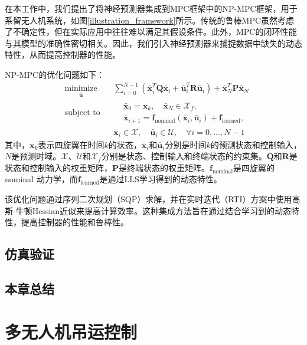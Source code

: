 \documentclass[lang=chs, degree=master, blindreview=false, winfonts=true]{yanputhesis}
\begin{document}
在本工作中，我们提出了将神经预测器集成到MPC框架中的NP-MPC框架，用于系留无人机系统，如图\ref{illustration_framework}所示。传统的鲁棒MPC虽然考虑了不确定性，但在实际应用中往往难以满足其假设条件。此外，MPC的闭环性能与其模型的准确性密切相关。因此，我们引入神经预测器来捕捉数据中缺失的动态特性，从而提高控制器的性能。

NP-MPC的优化问题如下：
\begin{equation}
	\begin{aligned} \label{nmpc}
		&\operatorname*{minimize}_{\bm{\bar{u}}}& & \sum_{i=0}^{N-1}\left(\bm{\bar{x}}_i^T\bm{Q}\bm{\bar{x}}_i + \bm{\bar{u}}_i^T\bm{R}\bm{\bar{u}}_i\right) + \bm{\bar{x}}_N^T\bm{P}\bm{\bar{x}}_N  \\
		&\text{subject to}& & \begin{aligned}
			&\bm{\bar{x}}_{0} = \bm{x}_k, \quad \bm{\bar{x}}_{N} \in \mathcal{X}_f, \\
			&\bm{\bar{x}}_{i+1} = \bm{f}_{\text{nominal}}(\bm{\bar{x}}_i, \bm{\bar{u}}_i) + \bm{f}_{\text{learned}},
		\end{aligned} \\
		&&& \bm{\bar{x}}_i \in \mathcal{X}, \quad \bm{\bar{u}}_i \in \mathcal{U}, \quad \forall i = 0, \ldots, N-1
	\end{aligned}
\end{equation}
其中，$\bm{x}_k$表示四旋翼在时间$k$的状态，$\bm{\bar{x}}_i$和$\bm{\bar{u}}_i$分别是时间$k$的预测状态和控制输入，$N$是预测时域。$\mathcal{X}$、$\mathcal{U}$和$\mathcal{X}_f$分别是状态、控制输入和终端状态的约束集。$\bm{Q}$和$\bm{R}$是状态和控制输入的权重矩阵，$\bm{P}$是终端状态的权重矩阵。$\bm{f}_{\text{nominal}}$是四旋翼的 nominal 动力学，而$\bm{f}_{\text{learned}}$是通过LLS学习得到的动态特性。

该优化问题通过序列二次规划（SQP）求解，并在实时迭代（RTI）方案中使用高斯-牛顿Hessian近似来提高计算效率。这种集成方法旨在通过结合学习到的动态特性，提高控制器的性能和鲁棒性。


\section{仿真验证}


\section{本章总结}




\cleardoublepage

\chapter{多无人机吊运控制}
\end{document}
